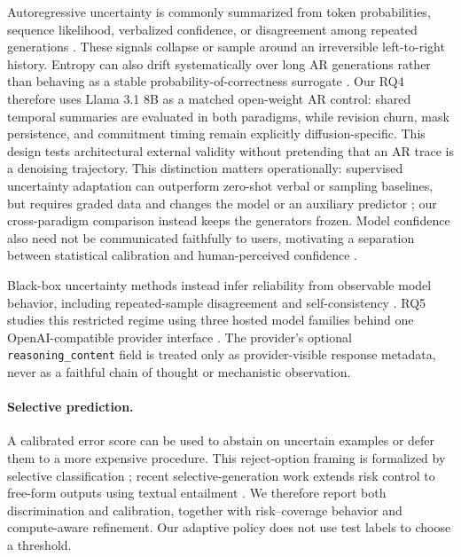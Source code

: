 \documentclass[10pt]{article}
\begin{document}
Autoregressive uncertainty is commonly summarized from token probabilities,
sequence likelihood, verbalized confidence, or disagreement among repeated
generations \citep{kadavath2022language,manakul2023selfcheckgpt}. These signals
collapse or sample around an irreversible left-to-right history. Entropy can
also drift systematically over long AR generations rather than behaving as a
stable probability-of-correctness surrogate \citep{cao2025entropy}. Our RQ4
therefore uses Llama 3.1 8B \citep{dubey2024llama3} as a matched open-weight AR
control: shared temporal summaries are evaluated in both paradigms, while
revision churn, mask persistence, and commitment timing remain explicitly
diffusion-specific. This design tests architectural external validity without
pretending that an AR trace is a denoising trajectory.
This distinction matters operationally: supervised uncertainty adaptation can
outperform zero-shot verbal or sampling baselines, but requires graded data and
changes the model or an auxiliary predictor \citep{kapoor2024taught}; our
cross-paradigm comparison instead keeps the generators frozen. Model confidence
also need not be communicated faithfully to users, motivating a separation
between statistical calibration and human-perceived confidence
\citep{steyvers2025confidence}.

Black-box uncertainty methods instead infer reliability from observable model
behavior, including repeated-sample disagreement and self-consistency
\citep{manakul2023selfcheckgpt}. RQ5 studies this restricted regime using three
hosted model families behind one OpenAI-compatible provider interface
\citep{siliconflowchat,siliconflowreasoning}. The provider's optional
\texttt{reasoning\_content} field is treated only as provider-visible response
metadata, never as a faithful chain of thought or mechanistic observation.

\paragraph{Selective prediction.}
A calibrated error score can be used to abstain on uncertain examples or defer them to a more expensive procedure.
This reject-option framing is formalized by selective classification \citep{geifman2017selective}; recent selective-generation work extends risk control to free-form outputs using textual entailment \citep{lee2024selectivegeneration}.
We therefore report both discrimination and calibration, together with risk--coverage behavior and compute-aware refinement.
Our adaptive policy does not use test labels to choose a threshold.
\end{document}
